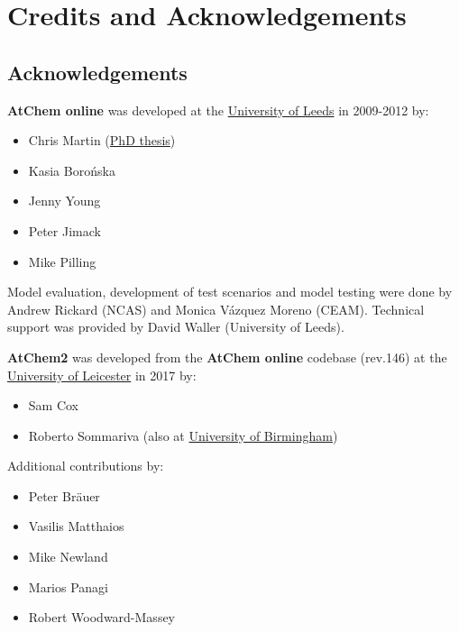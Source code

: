 %
%
%
%
\chapter{Credits and Acknowledgements} \label{ch:credits}

\section{Acknowledgements} \label{sec:acknowledgements}

\textbf{AtChem online} was developed at the
\href{https://www.leeds.ac.uk}{University of Leeds} in 2009-2012 by:

\begin{itemize}
\item Chris Martin (\href{http://etheses.whiterose.ac.uk/1596/}{PhD
    thesis})
\item Kasia Boro{\'n}ska
\item Jenny Young
\item Peter Jimack
\item Mike Pilling
\end{itemize}

Model evaluation, development of test scenarios and model testing were
done by Andrew Rickard (NCAS) and Monica V{\'a}zquez Moreno (CEAM).
Technical support was provided by David Waller (University of Leeds).

\textbf{AtChem2} was developed from the \textbf{AtChem online}
codebase (rev.146) at the \href{https://le.ac.uk}{University of
  Leicester} in 2017 by:

\begin{itemize}
\item Sam Cox
\item Roberto Sommariva (also at
  \href{https://www.birmingham.ac.uk}{University of Birmingham})
\end{itemize}

Additional contributions by:

\begin{itemize}
\item Peter Br{\"a}uer
\item Vasilis Matthaios
\item Mike Newland
\item Marios Panagi
\item Robert Woodward-Massey
\end{itemize}

